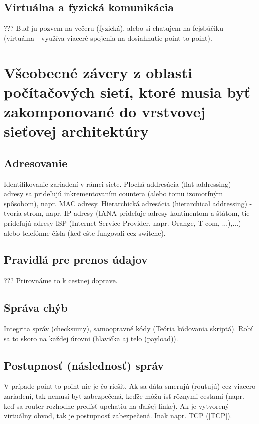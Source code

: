 \documentclass[10pt,a4paper]{article}
\begin{document}
\subsection{Virtuálna a fyzická komunikácia}      
???
Buď ju pozvem na večeru (fyzická), alebo si chatujem na fejsbúčiku (virtuálna - využíva viaceré spojenia na dosiahnutie point-to-point). 
                            
\section{Všeobecné závery z oblasti počítačových sietí, ktoré musia byť zakomponované do vrstvovej sieťovej architektúry}   
\subsection{Adresovanie}    
Identifikovanie zariadení v rámci siete. Plochá addresácia (flat addressing) - adresy sa prideľujú inkrementovaním countera (alebo tomu izomorfným spôsobom), napr. MAC adresy.
Hierarchická adresácia (hierarchical addressing) - tvoria strom, napr. IP adresy (IANA prideľuje adresy kontinentom a štátom, tie prideľujú adresy ISP (Internet Service Provider, napr. Orange, T-com, ...),...) alebo telefónne čísla (keď ešte fungovali cez switche).
              
\subsection{Pravidlá pre prenos údajov}   
???
Prirovnáme to k cestnej doprave. 

\subsection{Správa chýb}
Integrita správ (checksumy), samoopravné kódy (\href{http://www.dcs.fmph.uniba.sk/texty/codebook.pdf}{Teória kódovania skriptá}). 
Robí sa to skoro na každej úrovni (hlavička aj telo (payload)).
                  
\subsection{Postupnosť (následnosť) správ}
V prípade point-to-point nie je čo riešiť. Ak sa dáta smerujú (routujú) cez viacero zariadení, tak nemusí byť zabezpečená, keďže môžu ísť rôznymi cestami (napr. keď sa router rozhodne predísť upchatiu na ďalšej linke). 
Ak je vytvorený virtuálny obvod, tak je postupnosť zabezpečená. Inak napr. TCP (\ref{TCP}).
 
\end{document}
